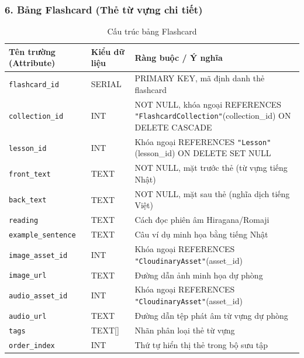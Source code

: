 \documentclass[../DoAn.tex]{subfiles}
\begin{document}
\subsubsection*{6. Bảng Flashcard (Thẻ từ vựng chi tiết)}
\begin{table}[H]
\centering
\footnotesize
\renewcommand{\arraystretch}{1.2}
\begin{tabular}{|p{4.2cm}|p{3.2cm}|p{7.1cm}|}
\hline
\textbf{Tên trường (Attribute)} & \textbf{Kiểu dữ liệu} & \textbf{Ràng buộc / Ý nghĩa} \\
\hline
\texttt{flashcard\_id} & SERIAL & PRIMARY KEY, mã định danh thẻ flashcard \\
\hline
\texttt{collection\_id} & INT & NOT NULL, khóa ngoại REFERENCES \texttt{"FlashcardCollection"}(collection\_id) ON DELETE CASCADE \\
\hline
\texttt{lesson\_id} & INT & Khóa ngoại REFERENCES \texttt{"Lesson"}(lesson\_id) ON DELETE SET NULL \\
\hline
\texttt{front\_text} & TEXT & NOT NULL, mặt trước thẻ (từ vựng tiếng Nhật) \\
\hline
\texttt{back\_text} & TEXT & NOT NULL, mặt sau thẻ (nghĩa dịch tiếng Việt) \\
\hline
\texttt{reading} & TEXT & Cách đọc phiên âm Hiragana/Romaji \\
\hline
\texttt{example\_sentence} & TEXT & Câu ví dụ minh họa bằng tiếng Nhật \\
\hline
\texttt{image\_asset\_id} & INT & Khóa ngoại REFERENCES \texttt{"CloudinaryAsset"}(asset\_id) \\
\hline
\texttt{image\_url} & TEXT & Đường dẫn ảnh minh họa dự phòng \\
\hline
\texttt{audio\_asset\_id} & INT & Khóa ngoại REFERENCES \texttt{"CloudinaryAsset"}(asset\_id) \\
\hline
\texttt{audio\_url} & TEXT & Đường dẫn tệp phát âm từ vựng dự phòng \\
\hline
\texttt{tags} & TEXT[] & Nhãn phân loại thẻ từ vựng \\
\hline
\texttt{order\_index} & INT & Thứ tự hiển thị thẻ trong bộ sưu tập \\
\hline
\end{tabular}
\caption{Cấu trúc bảng Flashcard}
\label{tab:schema_flashcard}
\end{table}
\end{document}
